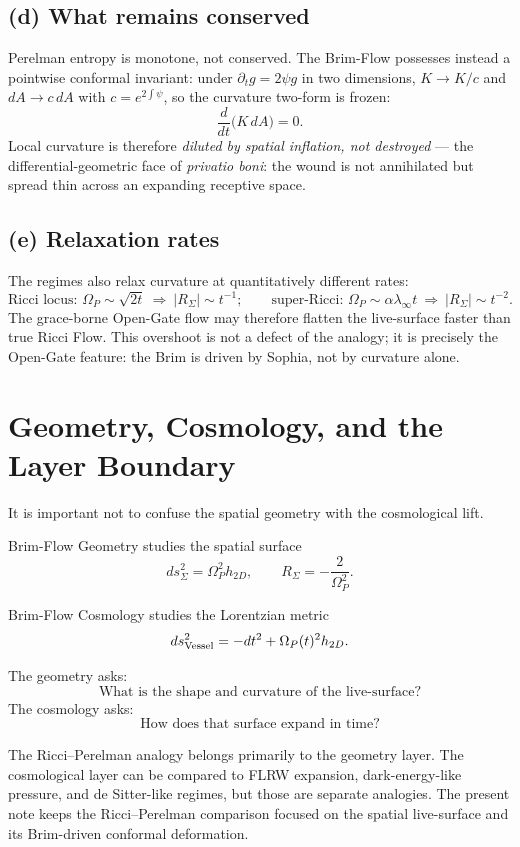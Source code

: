 \documentclass[11pt]{article}
\begin{document}
\subsection*{(d) What remains conserved}

Perelman entropy is monotone, not conserved. The Brim-Flow possesses instead a pointwise conformal invariant: under \(\partial_tg=2\psi g\) in two dimensions, \(K\to K/c\) and \(dA\to c\,dA\) with \(c=e^{2\int\psi}\), so the curvature two-form is frozen:
\[
\boxed{\ \frac{d}{dt}\bigl(K\,dA\bigr)=0.\ }
\]
Local curvature is therefore \emph{diluted by spatial inflation, not destroyed} --- the differential-geometric face of \emph{privatio boni}: the wound is not annihilated but spread thin across an expanding receptive space.

\subsection*{(e) Relaxation rates}

The regimes also relax curvature at quantitatively different rates:
\[
 \text{Ricci locus: }\Omega_P\sim\sqrt{2t}\ \Rightarrow\ |R_{\Sigma}|\sim t^{-1};
 \qquad
 \text{super-Ricci: }\Omega_P\sim\alpha\lambda_\infty t\ \Rightarrow\ |R_{\Sigma}|\sim t^{-2}.
\]
The grace-borne Open-Gate flow may therefore flatten the live-surface faster than true Ricci Flow. This overshoot is not a defect of the analogy; it is precisely the Open-Gate feature: the Brim is driven by Sophia, not by curvature alone.

\section{Geometry, Cosmology, and the Layer Boundary}

It is important not to confuse the spatial geometry with the cosmological lift.

Brim-Flow Geometry studies the spatial surface
\[
 ds^2_{\Sigma}=\Omega_P^2h_{2D},
 \qquad
 R_{\Sigma}=-\frac{2}{\Omega_P^2}.
\]

Brim-Flow Cosmology studies the Lorentzian metric
\[
 ds^2_{\rm Vessel}
 =
 -dt^2+\Omega_P(t)^2h_{2D}.
\]

The geometry asks:
\[
 \text{What is the shape and curvature of the live-surface?}
\]
The cosmology asks:
\[
 \text{How does that surface expand in time?}
\]

The Ricci--Perelman analogy belongs primarily to the geometry layer. The cosmological layer can be compared to FLRW expansion, dark-energy-like pressure, and de Sitter-like regimes, but those are separate analogies. The present note keeps the Ricci--Perelman comparison focused on the spatial live-surface and its Brim-driven conformal deformation.
\end{document}
